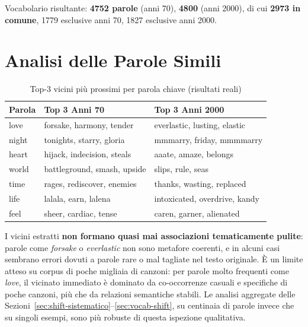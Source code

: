 \documentclass[12pt,a4paper]{article}
\begin{document}
Vocabolario risultante: \textbf{4752 parole} (anni 70), \textbf{4800} (anni 2000), di cui \textbf{2973 in comune}, 1779 esclusive anni 70, 1827 esclusive anni 2000.

\section{Analisi delle Parole Simili}
\label{sec:parole-simili}

\begin{table}[H]
  \centering
  \caption{Top-3 vicini pi\`u prossimi per parola chiave (risultati reali)}
  \small
  \begin{tabular}{lll}
    \toprule
    \textbf{Parola} & \textbf{Top 3 Anni 70} & \textbf{Top 3 Anni 2000} \\
    \midrule
    love  & forsake, harmony, tender  & everlastic, lusting, elastic \\
    night & tonights, starry, gloria  & mmmarry, friday, mmmmarry \\
    heart & hijack, indecision, steals & aaate, amaze, belongs \\
    world & battleground, smash, upside & slips, rule, seas \\
    time  & rages, rediscover, enemies & thanks, wasting, replaced \\
    life  & lalala, earn, lalena      & intoxicated, overdrive, kandy \\
    feel  & sheer, cardiac, tense     & caren, garner, alienated \\
    \bottomrule
  \end{tabular}
\end{table}

I vicini estratti \textbf{non formano quasi mai associazioni tematicamente pulite}: parole come \textit{forsake} o \textit{everlastic} non sono metafore coerenti, e in alcuni casi sembrano errori dovuti a parole rare o mal tagliate nel testo originale. \`E un limite atteso su corpus di poche migliaia di canzoni: per parole molto frequenti come \textit{love}, il vicinato immediato \`e dominato da co-occorrenze casuali e specifiche di poche canzoni, pi\`u che da relazioni semantiche stabili. Le analisi aggregate delle Sezioni~\ref{sec:shift-sistematico}--\ref{sec:vocab-shift}, su centinaia di parole invece che su singoli esempi, sono pi\`u robuste di questa ispezione qualitativa.
\end{document}
